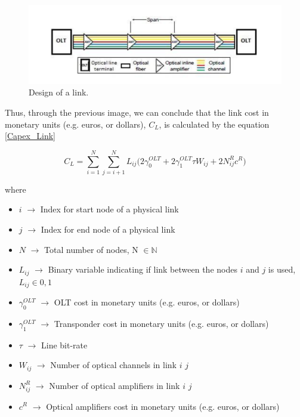 \begin{figure}[h!]
\centering
\includegraphics[width=\textwidth]{sdf/ILP/figures/link_design}
\caption{Design of a link.}
\label{link_design}
\end{figure}

\newpage
Thus, through the previous image, we can conclude that the link cost in monetary units (e.g. euros, or dollars), $C_L$, is calculated by the equation \ref{Capex_Link}

\begin{equation}
C_L = \sum_{i=1}^N \sum_{j=i+1}^N L_{ij} \bigg( 2 \gamma_0^{OLT} + 2 \gamma_1^{OLT} \tau W_{ij} + 2 N^R_{ij} c^R \bigg)
\label{Capex_Link}
\end{equation}

where
\begin{itemize}
\item{$i$               $\rightarrow$   Index for start node of a physical link}
\item{$j$               $\rightarrow$   Index for end node of a physical link}
\item{$N$				$\rightarrow$	Total number of nodes, N $\in \mathbb{N}$}
\item{$L_{ij}$			$\rightarrow$	Binary variable indicating if link between the nodes $i$ and $j$ is used, $L_{ij} \in {0, 1}$}
\item{$\gamma_0^{OLT}$	$\rightarrow$	OLT cost in monetary units (e.g. euros, or dollars)}
\item{$\gamma_1^{OLT}$	$\rightarrow$	Transponder cost in monetary units (e.g. euros, or dollars)}
\item{$\tau$		    $\rightarrow$	Line bit-rate}
\item{$W_{ij}$          $\rightarrow$   Number of optical channels in link $i$ $j$}
\item{$N^R_{ij}$    	$\rightarrow$	Number of optical amplifiers in link $i$ $j$}
\item{$c^R$				$\rightarrow$	Optical amplifiers cost in monetary units (e.g. euros, or dollars)}
\end{itemize}

